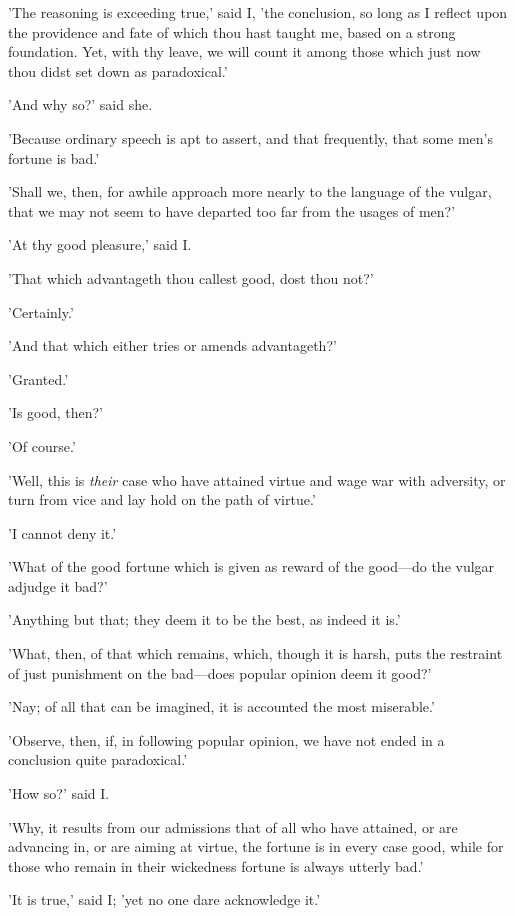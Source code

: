 'The reasoning is exceeding true,' said I, 'the conclusion, so long as I
reflect upon the providence and fate of which thou hast taught me, based
on a strong foundation. Yet, with thy leave, we will count it among
those which just now thou didst set down as paradoxical.'

'And why so?' said she.

'Because ordinary speech is apt to assert, and that frequently, that
some men's fortune is bad.'

'Shall we, then, for awhile approach more nearly to the language of the
vulgar, that we may not seem to have departed too far from the usages of
men?'

'At thy good pleasure,' said I.

'That which advantageth thou callest good, dost thou not?'

'Certainly.'

'And that which either tries or amends advantageth?'

'Granted.'

'Is good, then?'

'Of course.'

'Well, this is \emph{their} case who have attained virtue and wage war with
adversity, or turn from vice and lay hold on the path of virtue.'

'I cannot deny it.'

'What of the good fortune which is given as reward of the good—do the
vulgar adjudge it bad?'

'Anything but that; they deem it to be the best, as indeed it is.'

'What, then, of that which remains, which, though it is harsh, puts the
restraint of just punishment on the bad—does popular opinion deem it
good?'

'Nay; of all that can be imagined, it is accounted the most miserable.'

'Observe, then, if, in following popular opinion, we have not ended in a
conclusion quite paradoxical.'

'How so?' said I.

'Why, it results from our admissions that of all who have attained, or
are advancing in, or are aiming at virtue, the fortune is in every case
good, while for those who remain in their wickedness fortune is always
utterly bad.'

'It is true,' said I; 'yet no one dare acknowledge it.'

